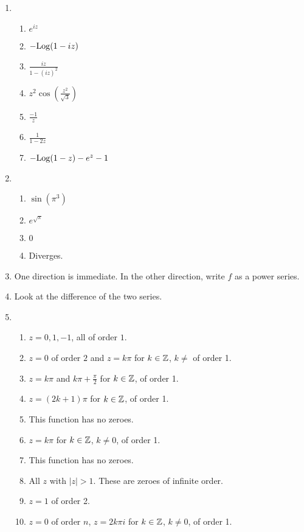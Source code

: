 \begin{enumerate}
	\item \begin{enumerate}
		\item $e^{iz}$
		\item $-\mathrm{Log}(1-iz)$
		\item $\frac{iz}{1-(iz)^2}$
		\item $z^2\cos\left(\frac{z^2}{\sqrt{3}}\right)$
		\item $\frac{-1}{z}$
		\item $\frac{1}{1-2z}$
		\item $-\mathrm{Log}(1-z) - e^z - 1$
	\end{enumerate}

	\item \begin{enumerate}
		\item $\sin(\pi^3)$	
		\item $e^{\sqrt{\pi}}$
		\item $0$
		\item Diverges.
	
	\end{enumerate}

	\item One direction is immediate. In the other direction, write $f$ as a power series.
	
	\item Look at the difference of the two series.
	
	\item \begin{enumerate}
		\item $z = 0 , 1, -1$, all of order $1$.
		\item $z = 0$ of order $2$ and $z = k\pi$ for $k\in \mathbb{Z}$, $k\ne$ of order 1.
		\item $z = k\pi$ and $k\pi + \frac{\pi}{2}$ for $k\in \mathbb{Z}$, of order 1.
		\item $z = (2k+1)\pi$ for $k\in \mathbb{Z}$, of order 1.
		\item This function has no zeroes.
		\item $z = k\pi$ for $k\in \mathbb{Z}$, $k\ne 0$, of order 1.
		\item This function has no zeroes.
		\item All $z$ with $|z| > 1$. These are zeroes of infinite order.
		\item $z = 1$ of order 2.
		\item $z = 0$ of order $n$, $z = 2k\pi i$ for $k\in \mathbb{Z}$, $k\ne 0$, of order 1.
	\end{enumerate}
	

\end{enumerate}
